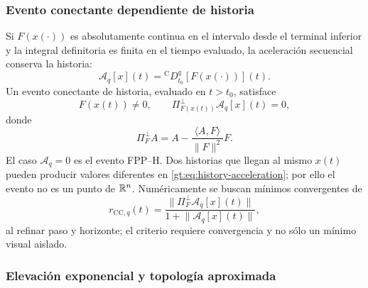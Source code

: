 \subsubsection{Evento conectante dependiente de historia}

Si $F(x(\cdot))$ es absolutamente continua en el intervalo desde el terminal
inferior y la integral definitoria es finita en el tiempo evaluado, la
aceleración secuencial conserva la historia:
\begin{equation}
 \mathcal A_q[x](t)
 ={}^{\mathrm C}D_{t_0}^{q}[F(x(\cdot))](t).
 \label{gt:eq:history-acceleration}
\end{equation}
Un evento conectante de historia, evaluado en $t>t_0$, satisface
\begin{equation}
 F(x(t))\ne0,
 \qquad
 \Pi_{F(x(t))}^{\perp}\mathcal A_q[x](t)=0,
 \label{gt:eq:history-connecting-event}
\end{equation}
donde
\begin{equation}
 \Pi_F^\perp A=A-\frac{\langle A,F\rangle}{\lVert F\rVert^2}F.
 \label{gt:eq:history-normal-projection}
\end{equation}
El caso $\mathcal A_q=0$ es el evento FPP--H. Dos historias que llegan al mismo
$x(t)$ pueden producir valores diferentes en
\eqref{gt:eq:history-acceleration}; por ello el evento no es un punto de
$\mathbb{R}^n$. Numéricamente se buscan mínimos convergentes de
\begin{equation}
 r_{\mathrm{CC},q}(t)=
 \frac{\lVert\Pi_F^\perp\mathcal A_q[x](t)\rVert}
 {1+\lVert\mathcal A_q[x](t)\rVert},
 \label{gt:eq:history-connecting-residual}
\end{equation}
al refinar paso y horizonte; el criterio requiere convergencia y no sólo un
mínimo visual aislado.

\subsubsection{Elevación exponencial y topología aproximada}

